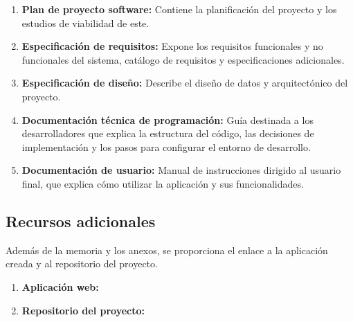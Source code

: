 \begin{enumerate}[label=\Alph*]
	\item \textbf{Plan de proyecto software:} Contiene la planificación del proyecto y los estudios de viabilidad de este.
	 
	\item \textbf{Especificación de requisitos:} Expone los requisitos funcionales y no funcionales del sistema, catálogo de requisitos y especificaciones adicionales.
	
	\item \textbf{Especificación de diseño:} Describe el diseño de datos y arquitectónico del proyecto.
	
	\item \textbf{Documentación técnica de programación:} Guía destinada a los desarrolladores que explica la estructura del código, las decisiones de implementación y los pasos para configurar el entorno de desarrollo.
	
	\item \textbf{Documentación de usuario:} Manual de instrucciones dirigido al usuario final, que explica cómo utilizar la aplicación y sus funcionalidades.
\end{enumerate}

\subsection{Recursos adicionales}

Además de la memoria y los anexos, se proporciona el enlace a la aplicación creada y al repositorio del proyecto.

\begin{enumerate}
	\item \textbf{Aplicación web:} 
	
	\item \textbf{Repositorio del proyecto:} 
\end{enumerate}
